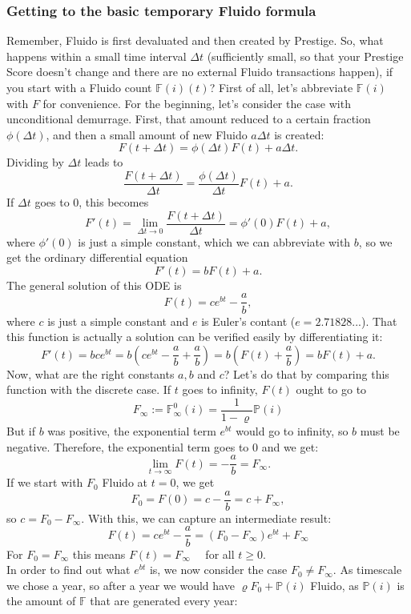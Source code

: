 \documentclass[a4paper,12pt]{scrartcl}
\newcounter{formula}
\begin{document}
\subsubsection{Getting to the basic temporary Fluido formula}
Remember, Fluido is first devaluated and then created by Prestige. So, what happens within a small time interval $\Delta t$ (sufficiently small, so that your Prestige Score doesn't change and there are no external Fluido transactions happen), if you start with a Fluido count $\mathbb{F}(i)(t)$? First of all, let's abbreviate $\mathbb{F}(i)$ with $F$ for convenience. For the beginning, let's consider the case with unconditional demurrage. First, that amount reduced to a certain fraction $\phi(\Delta t)$, and then a small amount of new Fluido $a \Delta t$ is created:
$$F(t+\Delta t)=\phi(\Delta t) F(t) + a \Delta t.$$ 
Dividing by $\Delta t$ leads to
$$\frac{F(t+\Delta t)}{\Delta t}=\frac{\phi(\Delta t)}{\Delta t} F(t) + a.$$
If $\Delta t$ goes to $0$, this becomes
$$F'(t)=\lim_{\Delta t \rightarrow 0} \frac{F(t+\Delta t)}{\Delta t} = \phi'(0) F(t) + a,$$
where $\phi'(0)$ is just a simple constant, which we can abbreviate with $b$, so we get the ordinary differential equation
$$F'(t)=b F(t) + a.$$
The general solution of this ODE is
$$F(t)=c e^{b t} - \frac{a}{b},$$
where $c$ is just a simple constant and $e$ is Euler's contant ($e=2.71828...$).
That this function is actually a solution can be verified easily by differentiating it:
$$F'(t)= b c e^{b t} = b \left( c e^{b t} -\frac{a}{b} + \frac{a}{b} \right) = b \left(F(t) + \frac{a}{b}\right) = b F(t) + a.$$   
Now, what are the right constants $a,b$ and $c$? Let's do that by comparing this function with the discrete case. If $t$ goes to infinity, $F(t)$ ought to go to
$$F_{\infty} := \mathbb{F}^0_{\infty}(i) = \frac{1}{1- \varrho} \mathbb{P}(i)$$
But if $b$ was positive, the exponential term $e^{b t}$ would go to infinity, so $b$ must be negative. Therefore, the exponential term goes to $0$ and we get:
$$\lim_{t \rightarrow \infty} F(t) =  -\frac{a}{b} = F_{\infty}.$$
If we start with $F_0$ Fluido at $t=0$, we get
$$F_0=F(0)=c-\frac{a}{b} = c+ F_{\infty},$$
so $c=F_0-F_{\infty}$. With this, we can capture an intermediate result:
$$F(t) = c e^{b t} - \frac{a}{b} = (F_0-F_{\infty}) e^{b t} + F_{\infty}$$
For $F_0 = F_{\infty}$ this means $F(t) = F_{\infty} \quad$ for all $t \geq 0$.\\
In order to find out what $e^{bt}$ is, we now consider the case $F_0 \neq F_{\infty}$. As timescale we chose a year, so after a year we would have $\varrho F_0+\mathbb{P}(i)$ Fluido, as $\mathbb{P}(i)$ is the amount of $\mathbb{F}$ that are generated every year:
\end{document}
